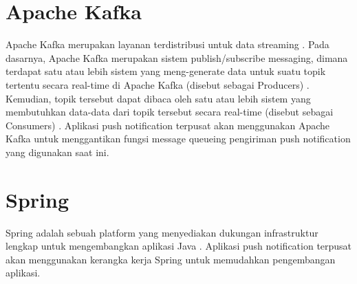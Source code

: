 \section{Apache Kafka}
\par Apache Kafka merupakan layanan terdistribusi untuk data streaming \cite{kafka-online}. Pada dasarnya, Apache Kafka merupakan sistem publish/subscribe messaging, dimana terdapat satu atau lebih sistem yang meng-generate data untuk suatu topik tertentu secara real-time di Apache Kafka (disebut sebagai Producers) \cite{kafka-online}. Kemudian, topik tersebut dapat dibaca oleh satu atau lebih sistem yang membutuhkan data-data dari topik tersebut secara real-time (disebut sebagai Consumers) \cite{kafka-online}. Aplikasi push notification terpusat akan menggunakan Apache Kafka untuk menggantikan fungsi message queueing pengiriman push notification yang digunakan saat ini.

\section{Spring}
\par Spring adalah sebuah platform yang menyediakan dukungan infrastruktur lengkap untuk mengembangkan aplikasi Java \cite{spring-online}. Aplikasi push notification terpusat akan menggunakan kerangka kerja Spring untuk memudahkan pengembangan aplikasi.